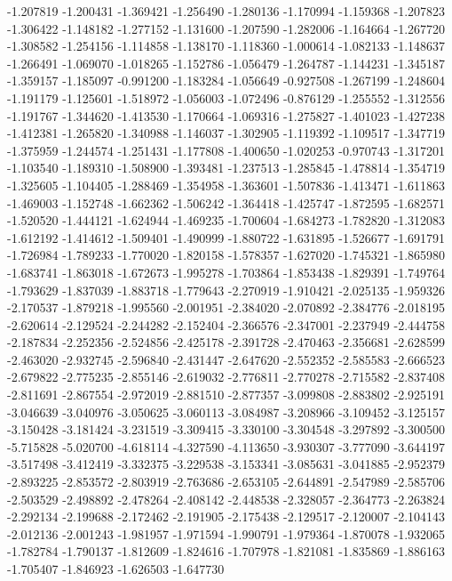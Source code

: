 -1.207819
-1.200431
-1.369421
-1.256490
-1.280136
-1.170994
-1.159368
-1.207823
-1.306422
-1.148182
-1.277152
-1.131600
-1.207590
-1.282006
-1.164664
-1.267720
-1.308582
-1.254156
-1.114858
-1.138170
-1.118360
-1.000614
-1.082133
-1.148637
-1.266491
-1.069070
-1.018265
-1.152786
-1.056479
-1.264787
-1.144231
-1.345187
-1.359157
-1.185097
-0.991200
-1.183284
-1.056649
-0.927508
-1.267199
-1.248604
-1.191179
-1.125601
-1.518972
-1.056003
-1.072496
-0.876129
-1.255552
-1.312556
-1.191767
-1.344620
-1.413530
-1.170664
-1.069316
-1.275827
-1.401023
-1.427238
-1.412381
-1.265820
-1.340988
-1.146037
-1.302905
-1.119392
-1.109517
-1.347719
-1.375959
-1.244574
-1.251431
-1.177808
-1.400650
-1.020253
-0.970743
-1.317201
-1.103540
-1.189310
-1.508900
-1.393481
-1.237513
-1.285845
-1.478814
-1.354719
-1.325605
-1.104405
-1.288469
-1.354958
-1.363601
-1.507836
-1.413471
-1.611863
-1.469003
-1.152748
-1.662362
-1.506242
-1.364418
-1.425747
-1.872595
-1.682571
-1.520520
-1.444121
-1.624944
-1.469235
-1.700604
-1.684273
-1.782820
-1.312083
-1.612192
-1.414612
-1.509401
-1.490999
-1.880722
-1.631895
-1.526677
-1.691791
-1.726984
-1.789233
-1.770020
-1.820158
-1.578357
-1.627020
-1.745321
-1.865980
-1.683741
-1.863018
-1.672673
-1.995278
-1.703864
-1.853438
-1.829391
-1.749764
-1.793629
-1.837039
-1.883718
-1.779643
-2.270919
-1.910421
-2.025135
-1.959326
-2.170537
-1.879218
-1.995560
-2.001951
-2.384020
-2.070892
-2.384776
-2.018195
-2.620614
-2.129524
-2.244282
-2.152404
-2.366576
-2.347001
-2.237949
-2.444758
-2.187834
-2.252356
-2.524856
-2.425178
-2.391728
-2.470463
-2.356681
-2.628599
-2.463020
-2.932745
-2.596840
-2.431447
-2.647620
-2.552352
-2.585583
-2.666523
-2.679822
-2.775235
-2.855146
-2.619032
-2.776811
-2.770278
-2.715582
-2.837408
-2.811691
-2.867554
-2.972019
-2.881510
-2.877357
-3.099808
-2.883802
-2.925191
-3.046639
-3.040976
-3.050625
-3.060113
-3.084987
-3.208966
-3.109452
-3.125157
-3.150428
-3.181424
-3.231519
-3.309415
-3.330100
-3.304548
-3.297892
-3.300500
-5.715828
-5.020700
-4.618114
-4.327590
-4.113650
-3.930307
-3.777090
-3.644197
-3.517498
-3.412419
-3.332375
-3.229538
-3.153341
-3.085631
-3.041885
-2.952379
-2.893225
-2.853572
-2.803919
-2.763686
-2.653105
-2.644891
-2.547989
-2.585706
-2.503529
-2.498892
-2.478264
-2.408142
-2.448538
-2.328057
-2.364773
-2.263824
-2.292134
-2.199688
-2.172462
-2.191905
-2.175438
-2.129517
-2.120007
-2.104143
-2.012136
-2.001243
-1.981957
-1.971594
-1.990791
-1.979364
-1.870078
-1.932065
-1.782784
-1.790137
-1.812609
-1.824616
-1.707978
-1.821081
-1.835869
-1.886163
-1.705407
-1.846923
-1.626503
-1.647730
